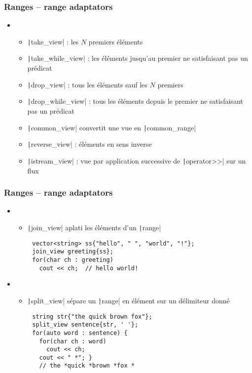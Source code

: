 \documentclass[C++.tex]{subfiles}
\begin{document}
\begin{frame}[fragile]
	\frametitle{Ranges -- range adaptators}
	\begin{itemize}
		\item  [] \begin{itemize}
			\item \texttt|take_view| : les $N$ premiers éléments
			\item \texttt|take_while_view| : les éléments jusqu'au premier ne satisfaisant pas un prédicat
			\item \texttt|drop_view| : tous les éléments sauf les $N$ premiers
			\item \texttt|drop_while_view| : tous les éléments depuis le premier ne satisfaisant pas un prédicat
			\item \texttt|common_view| convertit une vue en \texttt|common_range|
			\item \texttt|reverse_view| : éléments en sens inverse
			\item \texttt|istream_view| : vue par application successive de \texttt|operator>>| sur un flux
		\end{itemize}
	\end{itemize}
\end{frame}

\begin{frame}[fragile]
	\frametitle{Ranges -- range adaptators}
	\begin{itemize}
		\item  [] \begin{itemize}
			\item \texttt|join_view| \og aplati\fg{} les éléments d'un \texttt|range|
		\end{itemize}
	\end{itemize}

	\begin{verbatim}
		vector<string> ss{"hello", " ", "world", "!"};
		join_view greeting{ss};
		for(char ch : greeting)
		  cout << ch;  // hello world!
  	\end{verbatim}

	\begin{itemize}
		\item  [] \begin{itemize}
			\item \texttt|split_view| sépare un \texttt|range| en élément sur un délimiteur donné
		\end{itemize}
	\end{itemize}

	\begin{verbatim}
		string str{"the quick brown fox"};
		split_view sentence{str, ' '};
		for(auto word : sentence) {
		  for(char ch : word)
		    cout << ch;
		  cout << " *"; }
		  // the *quick *brown *fox *
  	\end{verbatim}
\end{frame}
\end{document}
